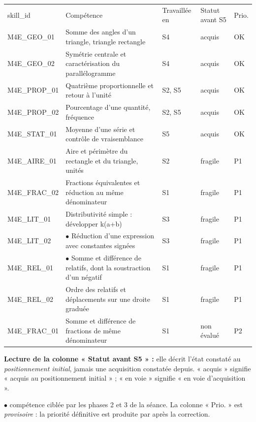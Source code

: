 \documentclass[10pt,a4paper]{article}
\begin{document}
\par\noindent\begin{tabularx}{\linewidth}{>{\ttfamily\scriptsize}p{27mm} X >{\scriptsize}p{16mm} >{\scriptsize}p{20mm} >{\scriptsize\centering\arraybackslash}p{9mm}}
\rowcolor{Navy}\color{white}\scriptsize skill\_id & \color{white}Compétence & \color{white}Travaillée en & \color{white}Statut avant S5 & \color{white}Prio. \\
M4E\_GEO\_01 & Somme des angles d'un triangle, triangle rectangle & S4 & acquis & OK \\
M4E\_GEO\_02 & Symétrie centrale et caractérisation du parallélogramme & S4 & acquis & OK \\
M4E\_PROP\_01 & Quatrième proportionnelle et retour à l'unité & S2, S5 & acquis & OK \\
M4E\_PROP\_02 & Pourcentage d'une quantité, fréquence & S2, S5 & acquis & OK \\
M4E\_STAT\_01 & Moyenne d'une série et contrôle de vraisemblance & S5 & acquis & OK \\
M4E\_AIRE\_01 & Aire et périmètre du rectangle et du triangle, unités & S2 & fragile & P1 \\
M4E\_FRAC\_02 & Fractions équivalentes et réduction au même dénominateur & S1 & fragile & P1 \\
M4E\_LIT\_01 & Distributivité simple : développer k(a+b) & S3 & fragile & P1 \\
M4E\_LIT\_02 & $\bullet$ Réduction d'une expression avec constantes signées & S3 & fragile & P1 \\
M4E\_REL\_01 & $\bullet$ Somme et différence de relatifs, dont la soustraction d'un négatif & S1 & fragile & P1 \\
M4E\_REL\_02 & Ordre des relatifs et déplacements sur une droite graduée & S1 & fragile & P1 \\
M4E\_FRAC\_01 & Somme et différence de fractions de même dénominateur & S1 & non évalué & P2 \\
\end{tabularx}
\par\vspace{1mm}\small\textbf{Lecture de la colonne « Statut avant S5 » :} elle décrit l'état constaté au \emph{positionnement initial}, jamais une acquisition constatée depuis. « acquis » signifie « acquis au positionnement initial » ; « en voie » signifie « en voie d'acquisition ».
\par\small$\bullet$ compétence ciblée par les phases 2 et 3 de la séance. La colonne « Prio. » est \emph{provisoire} : la priorité définitive est produite par  après la correction.
\end{document}
